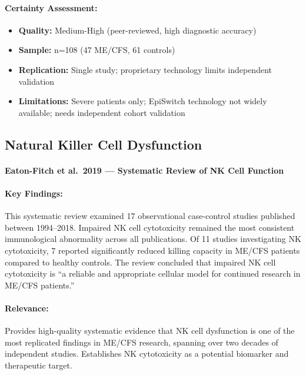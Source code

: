 \paragraph{Certainty Assessment:}
\begin{itemize}
    \item \textbf{Quality:} Medium-High (peer-reviewed, high diagnostic accuracy)
    \item \textbf{Sample:} n=108 (47 ME/CFS, 61 controls)
    \item \textbf{Replication:} Single study; proprietary technology limits independent validation
    \item \textbf{Limitations:} Severe patients only; EpiSwitch technology not widely available; needs independent cohort validation
\end{itemize}

\subsection{Natural Killer Cell Dysfunction}

\paragraph{Eaton-Fitch et al.\ 2019 --- Systematic Review of NK Cell Function}

\cite{EatonFitch2019}

\paragraph{Key Findings:}
This systematic review examined 17 observational case-control studies published between 1994--2018. Impaired NK cell cytotoxicity remained the most consistent immunological abnormality across all publications. Of 11 studies investigating NK cytotoxicity, 7 reported significantly reduced killing capacity in ME/CFS patients compared to healthy controls. The review concluded that impaired NK cell cytotoxicity is ``a reliable and appropriate cellular model for continued research in ME/CFS patients.''

\paragraph{Relevance:}
Provides high-quality systematic evidence that NK cell dysfunction is one of the most replicated findings in ME/CFS research, spanning over two decades of independent studies. Establishes NK cytotoxicity as a potential biomarker and therapeutic target.

